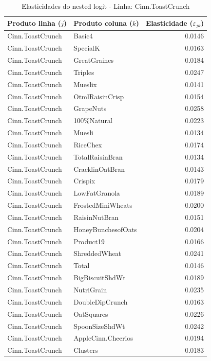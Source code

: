 \begingroup
\begin{table}[H]
\centering
\caption{Elasticidades do nested logit - Linha: Cinn.ToastCrunch}
\label{tab:elas-nested-cinn-toastcrunch}
\small
\begin{tabular}{llr}
\toprule
Produto linha ($j$) & Produto coluna ($k$) & Elasticidade ($\varepsilon_{jk}$) \\
\midrule
Cinn.ToastCrunch & Basic4 & 0.0146 \\
Cinn.ToastCrunch & SpecialK & 0.0163 \\
Cinn.ToastCrunch & GreatGraines & 0.0184 \\
Cinn.ToastCrunch & Triples & 0.0247 \\
Cinn.ToastCrunch & Mueslix & 0.0141 \\
Cinn.ToastCrunch & OtmlRaisinCrisp & 0.0154 \\
Cinn.ToastCrunch & GrapeNuts & 0.0258 \\
Cinn.ToastCrunch & 100\%Natural & 0.0223 \\
Cinn.ToastCrunch & Muesli & 0.0134 \\
Cinn.ToastCrunch & RiceChex & 0.0174 \\
Cinn.ToastCrunch & TotalRaisinBran & 0.0134 \\
Cinn.ToastCrunch & CracklinOatBran & 0.0143 \\
Cinn.ToastCrunch & Crispix & 0.0179 \\
Cinn.ToastCrunch & LowFatGranola & 0.0189 \\
Cinn.ToastCrunch & FrostedMiniWheats & 0.0200 \\
Cinn.ToastCrunch & RaisinNutBran & 0.0151 \\
Cinn.ToastCrunch & HoneyBunchesofOats & 0.0204 \\
Cinn.ToastCrunch & Product19 & 0.0166 \\
Cinn.ToastCrunch & ShreddedWheat & 0.0241 \\
Cinn.ToastCrunch & Total & 0.0146 \\
Cinn.ToastCrunch & BigBiscuitShdWt & 0.0189 \\
Cinn.ToastCrunch & NutriGrain & 0.0235 \\
Cinn.ToastCrunch & DoubleDipCrunch & 0.0163 \\
Cinn.ToastCrunch & OatSquares & 0.0226 \\
Cinn.ToastCrunch & SpoonSizeShdWt & 0.0242 \\
Cinn.ToastCrunch & AppleCinn.Cheerios & 0.0194 \\
Cinn.ToastCrunch & Clusters & 0.0183 \\

\end{tabular}
\end{table}
